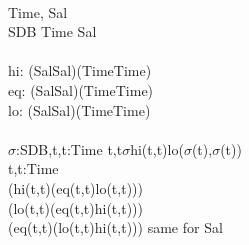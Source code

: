 {{%
\bp
{}\\
\>Time, Sal\\
\>SDB {\EQ} Time {\MARROW} Sal\\
\\
\>hi: (Sal{\TIMES}Sal){\BAR}(Time{\TIMES}Time) {\RIGHTARROW} \\
\>eq: (Sal{\TIMES}Sal){\BAR}(Time{\TIMES}Time) {\RIGHTARROW} \\
\>lo: (Sal{\TIMES}Sal){\BAR}(Time{\TIMES}Time) {\RIGHTARROW} \\
\\
\>{\ALL} $\sigma$:SDB,t,t{\PRIM}:Time {\RDOT} {\LBRACE}t,t{\PRIM}{\RBRACE}{\SUBSETEQ}$\sigma${\WEDGE}hi(t{\PRIM},t){\DBLRIGHTARROW}{\SIM}lo($\sigma$(t{\PRIM}),$\sigma$(t))\\
\>{\ALL} t,t{\PRIM}:Time {\RDOT}\\
\>\>(hi(t{\PRIM},t){\IS}{\SIM}(eq(t{\PRIM},t){\VEE}lo(t{\PRIM},t))) {\WEDGE}\\
\>\>(lo(t{\PRIM},t){\IS}{\SIM}(eq(t{\PRIM},t){\VEE}hi(t{\PRIM},t))) {\WEDGE}\\
\>\>(eq(t{\PRIM},t){\IS}{\SIM}(lo(t{\PRIM},t){\VEE}hi(t{\PRIM},t))) {\DOTDOTDOT} {\LCOMMENT} same for Sal {\RCOMMENT}
\ep
}%

\pos{\psno}{\mnewfoil}

}
